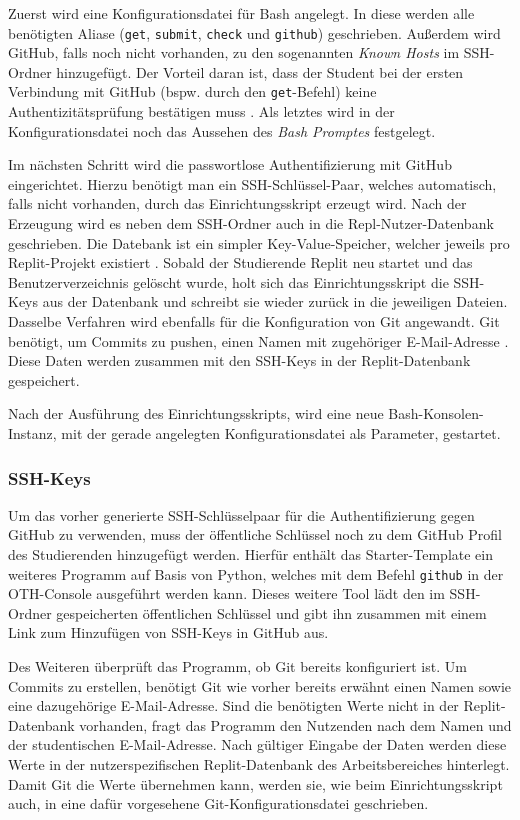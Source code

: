 Zuerst wird eine Konfigurationsdatei für Bash angelegt. In diese werden alle
benötigten Aliase (\texttt{get}, \texttt{submit}, \texttt{check} und
\texttt{github}) geschrieben. Außerdem wird GitHub, falls noch nicht vorhanden,
zu den sogenannten \emph{Known Hosts} im SSH-Ordner hinzugefügt. Der Vorteil
daran ist, dass der Student bei der ersten Verbindung mit GitHub (bspw. durch
den \texttt{get}-Befehl) keine Authentizitätsprüfung bestätigen muss
\parencite{ssh}. Als letztes wird in der Konfigurationsdatei noch das Aussehen
des \emph{Bash Promptes} festgelegt.

Im nächsten Schritt wird die passwortlose Authentifizierung mit GitHub
eingerichtet. Hierzu benötigt man ein SSH-Schlüssel-Paar, welches automatisch,
falls nicht vorhanden, durch das Einrichtungsskript erzeugt wird. Nach der
Erzeugung wird es neben dem SSH-Ordner auch in die Repl-Nutzer-Datenbank
geschrieben. Die Datebank ist ein simpler Key-Value-Speicher, welcher jeweils
pro Replit-Projekt existiert \parencite{replit-database}. Sobald der Studierende
Replit neu startet und das Benutzerverzeichnis gelöscht wurde, holt sich das
Einrichtungsskript die SSH-Keys aus der Datenbank und schreibt sie wieder
zurück in die jeweiligen Dateien. Dasselbe Verfahren wird ebenfalls für die
Konfiguration von Git angewandt. Git benötigt, um Commits zu pushen, einen 
Namen mit zugehöriger E-Mail-Adresse \parencite{git-config}. Diese Daten werden
zusammen mit den SSH-Keys in der Replit-Datenbank gespeichert.

Nach der Ausführung des Einrichtungsskripts, wird eine neue
Bash-Konsolen-Instanz, mit der gerade angelegten Konfigurationsdatei als
Parameter, gestartet.

\subsubsection{SSH-Keys}\label{replit-template-ssh-keys}
Um das vorher generierte SSH-Schlüsselpaar für die Authentifizierung gegen
GitHub zu verwenden, muss der öffentliche Schlüssel noch zu dem GitHub Profil
des Studierenden hinzugefügt werden. Hierfür enthält das Starter-Template ein
weiteres Programm auf Basis von Python, welches mit dem Befehl \texttt{github}
in der OTH-Console ausgeführt werden kann. Dieses weitere Tool lädt den im
SSH-Ordner gespeicherten öffentlichen Schlüssel und gibt ihn zusammen mit einem
Link zum Hinzufügen von SSH-Keys in GitHub aus.

Des Weiteren überprüft das Programm, ob Git bereits konfiguriert ist. Um Commits
zu erstellen, benötigt Git wie vorher bereits erwähnt einen Namen sowie eine
dazugehörige E-Mail-Adresse. Sind die benötigten Werte nicht in der
Replit-Datenbank vorhanden, fragt das Programm den Nutzenden nach dem Namen und
der studentischen E-Mail-Adresse. Nach gültiger Eingabe der Daten werden diese
Werte in der nutzerspezifischen Replit-Datenbank des Arbeitsbereiches
hinterlegt. Damit Git die Werte übernehmen kann, werden sie, wie beim
Einrichtungsskript auch, in eine dafür vorgesehene Git-Konfigurationsdatei
geschrieben.